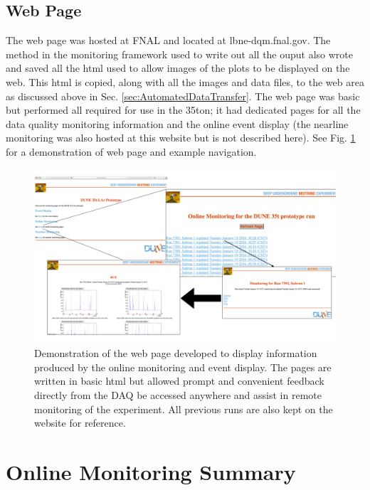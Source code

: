 \subsection{Web Page}\label{sec:WebPage}

The web page was hosted at FNAL and located at lbne-dqm.fnal.gov.  The method in the monitoring framework used to write out all the ouput also wrote and saved all the html used to allow images of the plots to be displayed on the web.  This html is copied, along with all the images and data files, to the web area as discussed above in Sec. \ref{sec:AutomatedDataTransfer}.  The web page was basic but performed all required for use in the 35ton; it had dedicated pages for all the data quality monitoring information and the online event display (the nearline monitoring was also hosted at this website but is not described here).  See Fig. \ref{fig:WebPage} for a demonstration of web page and example navigation.

\begin{figure}[ht]
  \centering
  \includegraphics[width=14cm]{webPage.png}
  \caption[Web page for online monitoring and event displays]{Demonstration of the web page developed to display information produced by the online monitoring and event display.  The pages are written in basic html but allowed prompt and convenient feedback directly from the DAQ be accessed anywhere and assist in remote monitoring of the experiment.  All previous runs are also kept on the website for reference.}
  \label{fig:WebPage}
\end{figure}

\section{Online Monitoring Summary}

